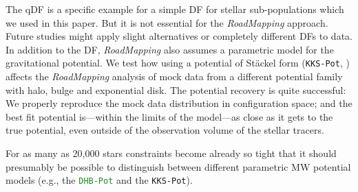 \documentclass[iop,revtex4]{emulateapj}
\newcommand{\RM}{{\sl RoadMapping}}
\newcommand{\NEW}[1]{\textcolor{ForestGreen}{#1}}
\newcommand{\OLD}[1]{}
\begin{document}
The qDF is a specific example for a simple DF for stellar sub-populations which we used in this paper. But it is not essential for the \RM{} approach. Future studies might apply slight alternatives or completely different DFs to data.\\

 In addition to the DF, \RM{} also assumes a parametric model for the gravitational potential. We test how using a potential of St\"{a}ckel form (\texttt{KKS-Pot}, \citealt{1994AA...287...43B}) affects the \RM{} analysis of mock data from a different potential family with halo, bulge and exponential disk. The potential recovery is quite successful: We properly reproduce the mock data distribution in configuration space; and the best fit potential is---within the limits of the model---as close as it gets to the true potential, even outside of the observation volume of the stellar tracers. 

For as many as 20,000 stars constraints become already so tight that it should presumably be possible to distinguish between different parametric MW potential models (e.g., the \OLD{\texttt{MW13-Pot} used by BR13}\NEW{\texttt{DHB-Pot}} and the \texttt{KKS-Pot}).
\end{document}

